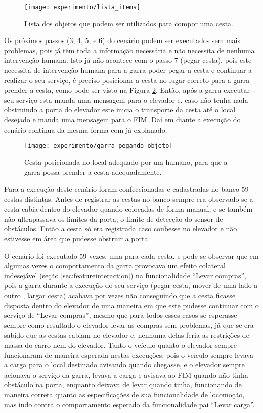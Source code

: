 \begin{figure}[!htb] \centering 
  \centering
  \texttt{[image: experimento/lista\_items]} 
  \caption{Lista dos objetos que podem ser utilizados para compor uma cesta.} 
  \label{fig:lista_objetos}
\end{figure}

Os próximos passos (3, 4, 5, e 6) do cenário podem ser executados sem mais problemas, pois já têm toda a informação necessária e não necessita de nenhuma intervenção humana. Isto já não acontece com o passo 7 (pegar cesta), pois este necessita de intervenção humana para a garra poder pegar a cesta e continuar a realizar o seu serviço, é preciso posicionar a cesta no lugar correto para a garra prender a cesta, como pode ser visto na Figura \ref{fig:garra_pegando_objeto}. Então, após a garra executar seu serviço esta manda uma mensagem para o elevador e, caso não tenha nada obstruindo a porta do elevador este inicia o transporte da cesta até o local desejado e manda uma mensagem para o FIM. Daí em diante a execução do cenário continua da mesma forma com já explanado.

\begin{figure}[!htb] \centering 
  \centering
  \texttt{[image: experimento/garra\_pegando\_objeto]} 
  \caption{Cesta posicionada no local adequado por um humano, para que a garra possa prender a cesta adequadamente.} 
  \label{fig:garra_pegando_objeto}
\end{figure}

Para a execução deste cenário foram confeccionadas e cadastradas no banco 59 cestas distintas. Antes de registrar as cestas no banco sempre era observado se a cesta cabia dentro do elevador quando colocadas de forma manual, e se também não ultrapassava os limites da porta, o limite de detecção do sensor de obstáculos. Então a cesta só era registrada caso coubesse no elevador e não estivesse em área que pudesse obstruir a porta.

O cenário foi executado 59 vezes, uma para cada cesta, e pode-se observar que em algumas vezes o comportamento da garra provocava um efeito colateral indesejável (seção \ref{sec:featureinteraction}) na funcionalidade ``Levar compras'', pois a garra durante a execução do seu serviço (pegar cesta, mover de uma lado a outro , largar cesta) acabava por vezes não conseguindo que a cesta ficasse disposta dentro do elevador de uma maneira em que este pudesse continuar com o serviço de ``Levar compras'', mesmo que para todos esses casos se esperasse sempre como resultado o elevador levar as compras sem problemas, já que se era sabido que as cestas cabiam no elevador e, nenhuma delas feria as restrições de massa do carro nem do elevador. Tanto o veículo quanto o elevador sempre funcionaram de maneira esperada nestas execuções, pois o veículo sempre levava a carga para o local destinado avisando quando chegasse, e o elevador sempre acionava o serviço da garra, levava a carga  e avisava ao FIM quando não tinha obstáculo na porta, enquanto deixava de levar quando tinha, funcionando de maneira correta quanto as especificações de sua funcionalidade de locomoção, mas indo contra o comportamento esperado da funcionalidade pai ``Levar carga''. 

